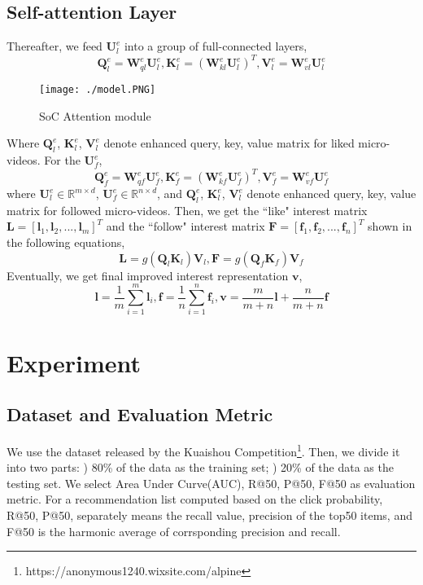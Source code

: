 \documentclass[letterpaper]{article} %
\begin{document}
	\subsection{Self-attention Layer}
	Thereafter, we feed $\mathbf{U}_{l}^{e}$ into a group of full-connected layers, 
	$$
	\mathbf{Q}_{l}^{e}=\mathbf{W}_{ql}^{e}\mathbf{U}_{l}^{e}, \mathbf{K}_{l}^{e}=\left(\mathbf{W}_{kl}^{e}\mathbf{U}_{l}^{e}\right)^{T}, \mathbf{V}_{l}^{e}=\mathbf{W}_{vl}^{e}\mathbf{U}_{l}^{e}
	$$
	\begin{figure}[htb]
		\centering
		\texttt{[image: ./model.PNG]}
		\caption{SoC Attention module}
		
	\end{figure}
	Where $\mathbf{Q}_{l}^{e}$, $\mathbf{K}_{l}^{e}$, $\mathbf{V}_{l}^{e}$ denote enhanced query, key, value matrix for liked micro-videos. For the $\mathbf{U}_{f}^{e}$, 
	$$
	\mathbf{Q}_{f}^{e}=\mathbf{W}_{qf}^{e}\mathbf{U}_{f}^{e}, \mathbf{K}_{f}^{e}=\left(\mathbf{W}_{kf}^{e}\mathbf{U}_{f}^{e}\right)^{T}, \mathbf{V}_{f}^{e}=\mathbf{W}_{vf}^{e}\mathbf{U}_{f}^{e}
	$$
	where $\mathbf{U}_{l}^{e} \in \mathbb{R}^{m \times d}$, $\mathbf{U}_{f}^{e} \in \mathbb{R}^{n \times d}$, and $\mathbf{Q}_{l}^{e}$, $\mathbf{K}_{l}^{e}$, $\mathbf{V}_{l}^{e}$ denote enhanced query, key, value matrix for followed micro-videos. Then, we get the ``like" interest matrix $\mathbf{L}=\left[\mathbf{l}_{1},\mathbf{l}_{2},...,\mathbf{l}_{m}\right]^{T}$ and the ``follow" interest matrix $\mathbf{F}=\left[\mathbf{f}_{1},\mathbf{f}_{2},...,\mathbf{f}_{n}\right]^{T}$ shown in the following equations, 
	$$
	\mathbf{L}=g(\mathbf{Q}_{l}\mathbf{K}_{l})\mathbf{V}_{l}, 
	\mathbf{F}=g(\mathbf{Q}_{f}\mathbf{K}_{f})\mathbf{V}_{f}
	$$ 
	Eventually, we get final improved interest representation $\mathbf{v}$,
	$$
	\mathbf{l}=\frac{1}{m}\sum_{i=1}^{m}\mathbf{l}_{i},
	\mathbf{f}=\frac{1}{n}\sum_{i=1}^{n}\mathbf{f}_{i},
	\mathbf{v}=\frac{m}{m+n}\mathbf{l}+\frac{n}{m+n}\mathbf{f}
	$$ 
	\section{Experiment}
	
	\subsection{Dataset and Evaluation Metric}
	We use the dataset released by the Kuaishou Competition\footnote{https://anonymous1240.wixsite.com/alpine}. Then, we divide it into two parts: ) 80\% of the data as the training set; ) 20\% of the data as the testing set. We select Area Under Curve(AUC), R@50, P@50, F@50 as evaluation metric. For a recommendation list computed based on the click probability, R@50, P@50, separately means the recall value, precision of the top50 items, and F@50 is the harmonic average of corrsponding precision and recall. 
\end{document}
